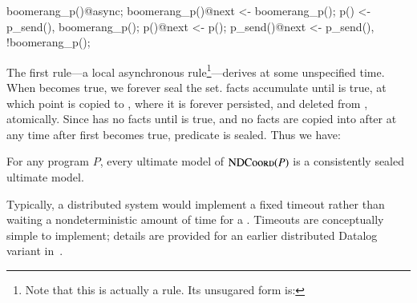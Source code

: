 \begin{Dedalus}
boomerang_p()@async;
boomerang_p()@next <- boomerang_p();
p() <- p_send(), boomerang_p();
p()@next <- p();
p_send()@next <- p_send(), !boomerang_p();
\end{Dedalus}

The first rule---a local asynchronous rule\footnote{Note that this is actually a rule.  Its unsugared form is: \linebreak {}}---derives  at some unspecified time.  When  becomes true, we forever seal the  set.   facts accumulate until  is true, at which point  is copied to , where it is forever persisted, and deleted from , atomically.  Since  has no  facts until  is true, and no  facts are copied into  after at any time after  first becomes true, predicate  is sealed.  Thus we have:

\begin{theorem}
For any program $P$, every ultimate model of \linebreak $\textsc{NDCoord}(P)$ is a consistently sealed ultimate model.
\end{theorem}

Typically, a distributed system would implement a fixed timeout rather than waiting a nondeterministic amount of time for a .  Timeouts are conceptually simple to implement; details are provided for an earlier distributed Datalog variant in~\cite{boom}.

%
%
